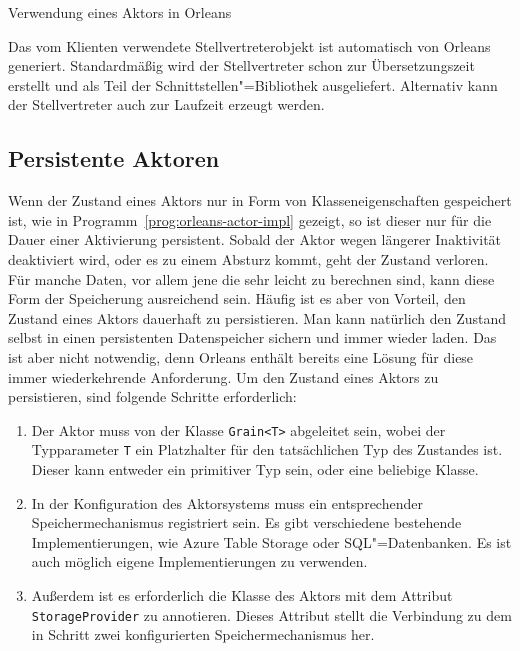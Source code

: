 \begin{program}[!hbt]
\caption{Verwendung eines Aktors in Orleans}
\label{prog:orleans-actor-client}
\end{program}

\iffalse $ \fi

Das vom Klienten verwendete Stellvertreterobjekt ist automatisch von Orleans generiert. Standardmäßig wird der Stellvertreter schon zur Übersetzungszeit erstellt und als Teil der Schnittstellen"=Bibliothek ausgeliefert. Alternativ kann der Stellvertreter auch zur Laufzeit erzeugt werden.

\subsection{Persistente Aktoren}

Wenn der Zustand eines Aktors nur in Form von Klasseneigenschaften gespeichert ist, wie in Programm~\ref{prog:orleans-actor-impl} gezeigt, so ist dieser nur für die Dauer einer Aktivierung persistent. Sobald der Aktor wegen längerer Inaktivität deaktiviert wird, oder es zu einem Absturz kommt, geht der Zustand verloren. Für manche Daten, vor allem jene die sehr leicht zu berechnen sind, kann diese Form der Speicherung ausreichend sein. Häufig ist es aber von Vorteil, den Zustand eines Aktors dauerhaft zu persistieren. Man kann natürlich den Zustand selbst in einen persistenten Datenspeicher sichern und immer wieder laden. Das ist aber nicht notwendig, denn Orleans enthält bereits eine Lösung für diese immer wiederkehrende Anforderung. Um den Zustand eines Aktors zu persistieren, sind folgende Schritte erforderlich:

\begin{enumerate}
	\item Der Aktor muss von der Klasse \lstinline{Grain<T>} abgeleitet sein, wobei der Typ\-parameter \lstinline{T} ein Platzhalter für den tatsächlichen Typ des Zustandes ist. Dieser kann entweder ein primitiver Typ sein, oder eine beliebige Klasse.
	\item In der Konfiguration des Aktorsystems muss ein entsprechender Speichermechanismus registriert sein. Es gibt verschiedene bestehende Implementierungen, wie \zB Azure Table Storage oder SQL"=Datenbanken. Es ist auch möglich eigene Implementierungen zu verwenden.
	\item Außerdem ist es erforderlich die Klasse des Aktors mit dem Attribut \lstinline{StorageProvider} zu annotieren. Dieses Attribut stellt die Verbindung zu dem in Schritt zwei konfigurierten Speichermechanismus her.
\end{enumerate}


